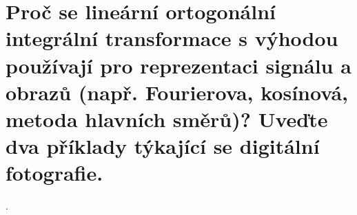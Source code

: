 \section{Proč se lineární ortogonální integrální transformace s výhodou používají pro reprezentaci signálu a obrazů 
(např. Fourierova, kosínová, metoda hlavních směrů)? Uveďte dva příklady týkající se digitální fotografie.}.